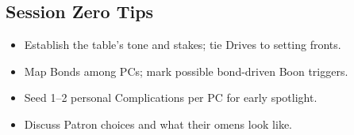 \subsection{Session Zero Tips}
\begin{itemize}
  \item Establish the table’s tone and stakes; tie Drives to setting fronts.
  \item Map Bonds among PCs; mark possible bond-driven Boon triggers.
  \item Seed 1--2 personal Complications per PC for early spotlight.
  \item Discuss Patron choices and what their omens look like.
\end{itemize}
